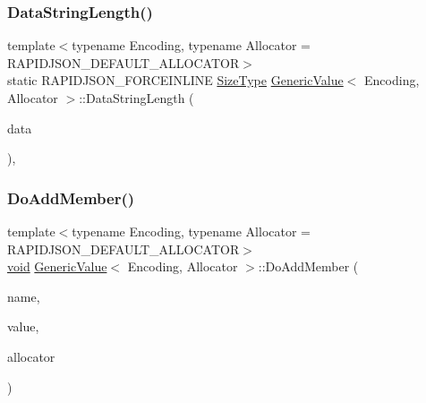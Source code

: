 \subsubsection{\texorpdfstring{Data\+String\+Length()}{DataStringLength()}}
{\footnotesize\ttfamily template$<$typename Encoding, typename Allocator = R\+A\+P\+I\+D\+J\+S\+O\+N\+\_\+\+D\+E\+F\+A\+U\+L\+T\+\_\+\+A\+L\+L\+O\+C\+A\+T\+OR$>$ \\
static R\+A\+P\+I\+D\+J\+S\+O\+N\+\_\+\+F\+O\+R\+C\+E\+I\+N\+L\+I\+NE \hyperlink{rapidjson_8h_a5ed6e6e67250fadbd041127e6386dcb5}{Size\+Type} \hyperlink{classGenericValue}{Generic\+Value}$<$ Encoding, Allocator $>$\+::Data\+String\+Length (\begin{DoxyParamCaption}\item[{const \hyperlink{unionGenericValue_1_1Data}{Data} \&}]{data }\end{DoxyParamCaption})\hspace{0.3cm}{\ttfamily [inline]}, {\ttfamily [static]}}

\mbox{\label{classGenericValue_a741c527ec9552ec0a7dce92f7b22d1c6}} 
\subsubsection{\texorpdfstring{Do\+Add\+Member()}{DoAddMember()}}
{\footnotesize\ttfamily template$<$typename Encoding, typename Allocator = R\+A\+P\+I\+D\+J\+S\+O\+N\+\_\+\+D\+E\+F\+A\+U\+L\+T\+\_\+\+A\+L\+L\+O\+C\+A\+T\+OR$>$ \\
\hyperlink{imgui__impl__opengl3__loader_8h_ac668e7cffd9e2e9cfee428b9b2f34fa7}{void} \hyperlink{classGenericValue}{Generic\+Value}$<$ Encoding, Allocator $>$\+::Do\+Add\+Member (\begin{DoxyParamCaption}\item[{\hyperlink{classGenericValue}{Generic\+Value}$<$ Encoding, Allocator $>$ \&}]{name,  }\item[{\hyperlink{classGenericValue}{Generic\+Value}$<$ Encoding, Allocator $>$ \&}]{value,  }\item[{Allocator \&}]{allocator }\end{DoxyParamCaption})\hspace{0.3cm}{\ttfamily [inline]}}

\mbox{\label{classGenericValue_af1c2af5189d3522bc885cb4101d1019d}} 

